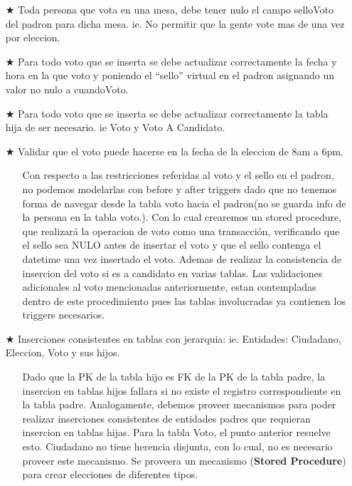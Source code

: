 \begin{itemize}
		\item[$\bigstar$] Toda persona que vota en una mesa, debe tener nulo el campo selloVoto del padron para dicha mesa. ie. No permitir que la gente vote mas de una vez por eleccion.
		\item[$\bigstar$] Para todo voto que se inserta se debe actualizar correctamente la fecha y hora en la que voto y poniendo el “sello” virtual en el padron asignando un valor no nulo a cuandoVoto.
		\item[$\bigstar$] Para todo voto que se inserta se debe actualizar correctamente la tabla hija de ser necesario. ie Voto y Voto A Candidato.
		\item[$\bigstar$] Validar que el voto puede hacerse en la fecha de la eleccion de 8am a 6pm.
		\begin{itemize}
			\item[\Checkmark] Con respecto a las restricciones referidas al voto y el sello en el padron, no podemos modelarlas con before y after triggers dado que no tenemos forma de navegar desde la tabla voto hacia el padron(no se guarda info de la persona en la tabla voto.). Con lo cual crearemos un stored procedure, que realizará la operacion de voto como una transacción, verificando que el sello sea NULO antes de insertar el voto y que el sello contenga el datetime una vez insertado el voto. Ademas de realizar la consistencia de insercion del voto si es a candidato en varias tablas. Las validaciones adicionales al voto mencionadas anteriormente, estan contempladas dentro de este procedimiento pues las tablas involucradas ya contienen los triggers necesarios.
		\end{itemize}
\end{itemize}
\vspace{1.2cm}
\begin{itemize}
	\item[$\bigstar$] Inserciones consistentes en tablas con jerarquia: ie. Entidades: Ciudadano, Eleccion, Voto y sus hijos. 
	\begin{itemize}
		\item[\Checkmark] Dado que la PK de la tabla hijo es FK de la PK de la tabla padre, la insercion en tablas hijos fallara si no existe el registro correspondiente en la tabla padre. Analogamente, debemos proveer mecanismos para poder realizar inserciones consistentes de entidades padres que requieran insercion en tablas hijas. Para la tabla Voto, el punto anterior resuelve esto. Ciudadano no tiene herencia disjunta, con lo cual, no es necesario proveer este mecanismo. Se proveera un mecanismo (\textbf{Stored Procedure}) para crear elecciones de diferentes tipos. 
	\end{itemize}
\end{itemize}


